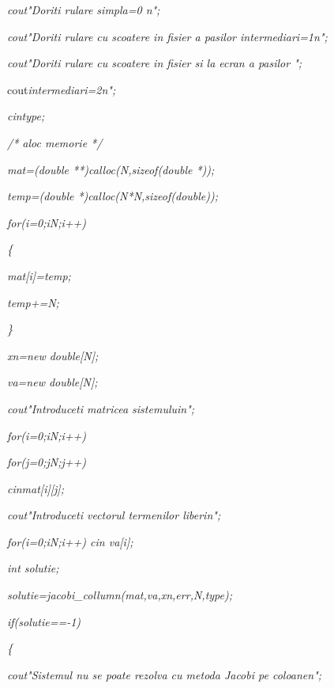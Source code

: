 \documentclass[a4paper,twoside]{book}
\begin{document}
\textit{\qquad cout\TEXTsymbol{<}\TEXTsymbol{<}"Doriti rulare simpla=0%
\TEXTsymbol{\backslash}n";}

\textit{\qquad cout\TEXTsymbol{<}\TEXTsymbol{<}"Doriti rulare cu scoatere in
fisier a pasilor intermediari=1\TEXTsymbol{\backslash}n";}

\textit{\qquad cout\TEXTsymbol{<}\TEXTsymbol{<}"Doriti rulare cu scoatere in
fisier si la ecran a pasilor ";}

\qquad cout\TEXTsymbol{<}\TEXTsymbol{<}\textit{intermediari=2\TEXTsymbol{%
\backslash}n";}

\textit{\qquad cin\TEXTsymbol{>}\TEXTsymbol{>}type;}

\textit{\qquad /* aloc memorie */}

\textit{\qquad mat=(double **)calloc(N,sizeof(double *));}

\textit{\qquad temp=(double *)calloc(N*N,sizeof(double));}

\textit{\qquad for(i=0;i\TEXTsymbol{<}N;i++)}

\textit{\qquad \{}

\textit{\qquad \qquad mat[i]=temp;}

\textit{\qquad \qquad temp+=N;}

\textit{\qquad \}}

\textit{\qquad xn=new double[N];}

\textit{\qquad va=new double[N];}

\textit{\qquad cout\TEXTsymbol{<}\TEXTsymbol{<}"Introduceti matricea
sistemului\TEXTsymbol{\backslash}n";}

\textit{\qquad for(i=0;i\TEXTsymbol{<}N;i++)}

\textit{\qquad \qquad for(j=0;j\TEXTsymbol{<}N;j++)}

\textit{\qquad \qquad \qquad cin\TEXTsymbol{>}\TEXTsymbol{>}mat[i][j];}

\textit{\qquad cout\TEXTsymbol{<}\TEXTsymbol{<}"Introduceti vectorul
termenilor liberi\TEXTsymbol{\backslash}n";}

\textit{\qquad for(i=0;i\TEXTsymbol{<}N;i++) cin\TEXTsymbol{>}\TEXTsymbol{>}%
va[i];}

\textit{\qquad int solutie;}

\textit{\qquad solutie=jacobi\_collumn(mat,va,xn,err,N,type);}

\textit{\qquad if(solutie==-1)}

\textit{\qquad \{}

\textit{\qquad \qquad cout\TEXTsymbol{<}\TEXTsymbol{<}"Sistemul nu se poate
rezolva cu metoda Jacobi pe coloane\TEXTsymbol{\backslash}n";}
\end{document}
